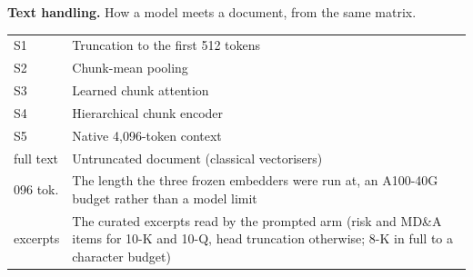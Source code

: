 \vspace{3mm}
\noindent\textbf{Text handling.} How a model meets a document, from the same matrix.
\par\nobreak
\vspace{1mm}
{\small\singlespacing
\noindent\begin{tabular}{@{}>{\raggedright\arraybackslash}p{}>{\raggedright\arraybackslash}p{}@{}}
\toprule
S1 & Truncation to the first 512 tokens \\
S2 & Chunk-mean pooling \\
S3 & Learned chunk attention \\
S4 & Hierarchical chunk encoder \\
S5 & Native 4{,}096-token context \\
\midrule
full text & Untruncated document (classical vectorisers) \\
4{,}096 tok. & The length the three frozen embedders were run at, an A100-40G budget rather than a model limit \\
excerpts & The curated excerpts read by the prompted arm (risk and MD\&A items for 10-K and 10-Q, head truncation otherwise; 8-K in full to a character budget) \\
\bottomrule
\end{tabular}\par
}


